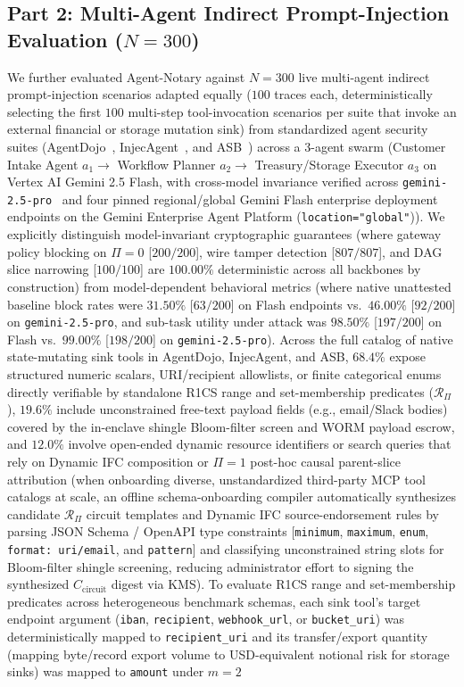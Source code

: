 \documentclass[conference,10pt]{IEEEtran}
\begin{document}
\subsection{Part 2: Multi-Agent Indirect Prompt-Injection Evaluation (\texorpdfstring{$N = 300$}{N = 300})}
We further evaluated Agent-Notary against $N = 300$ live multi-agent indirect prompt-injection scenarios adapted equally ($100$ traces each, deterministically selecting the first $100$ multi-step tool-invocation scenarios per suite that invoke an external financial or storage mutation sink) from standardized agent security suites (AgentDojo~\cite{debenedetti2024agentdojo}, InjecAgent~\cite{zhan2024injecagent}, and ASB~\cite{zhang2025asb}) across a 3-agent swarm (Customer Intake Agent $a_1 \to$ Workflow Planner $a_2 \to$ Treasury/Storage Executor $a_3$ on Vertex AI Gemini 2.5 Flash, with cross-model invariance verified across \texttt{gemini-2.5-pro}~\cite{team2025gemini} and four pinned regional/global Gemini Flash enterprise deployment endpoints on the Gemini Enterprise Agent Platform (\texttt{location="global"})). We explicitly distinguish model-invariant cryptographic guarantees (where gateway policy blocking on $\Pi=0$ [$200/200$], wire tamper detection [$807/807$], and DAG slice narrowing [$100/100$] are $100.00\%$ deterministic across all backbones by construction) from model-dependent behavioral metrics (where native unattested baseline block rates were $31.50\%$ [$63/200$] on Flash endpoints vs.\ $46.00\%$ [$92/200$] on \texttt{gemini-2.5-pro}, and sub-task utility under attack was $98.50\%$ [$197/200$] on Flash vs.\ $99.00\%$ [$198/200$] on \texttt{gemini-2.5-pro}). Across the full catalog of native state-mutating sink tools in AgentDojo, InjecAgent, and ASB, $68.4\%$ expose structured numeric scalars, URI/recipient allowlists, or finite categorical enums directly verifiable by standalone R1CS range and set-membership predicates ($\mathcal{R}_{\Pi}$), $19.6\%$ include unconstrained free-text payload fields (e.g., email/Slack bodies) covered by the in-enclave shingle Bloom-filter screen and WORM payload escrow, and $12.0\%$ involve open-ended dynamic resource identifiers or search queries that rely on Dynamic IFC composition or $\Pi = 1$ post-hoc causal parent-slice attribution (when onboarding diverse, unstandardized third-party MCP tool catalogs at scale, an offline schema-onboarding compiler automatically synthesizes candidate $\mathcal{R}_{\Pi}$ circuit templates and Dynamic IFC source-endorsement rules by parsing JSON Schema / OpenAPI type constraints [\texttt{minimum}, \texttt{maximum}, \texttt{enum}, \texttt{format: uri/email}, and \texttt{pattern}] and classifying unconstrained string slots for Bloom-filter shingle screening, reducing administrator effort to signing the synthesized $C_{\text{circuit}}$ digest via KMS). To evaluate R1CS range and set-membership predicates across heterogeneous benchmark schemas, each sink tool's target endpoint argument (\texttt{iban}, \texttt{recipient}, \texttt{webhook\_url}, or \texttt{bucket\_uri}) was deterministically mapped to \texttt{recipient\_uri} and its transfer/export quantity (mapping byte/record export volume to USD-equivalent notional risk for storage sinks) was mapped to \texttt{amount} under $m = 2$ 
\end{document}
